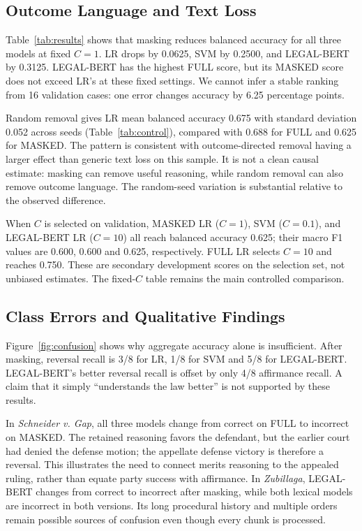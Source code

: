 \documentclass[conference]{IEEEtran}
\begin{document}
\subsection{Outcome Language and Text Loss}
Table~\ref{tab:results} shows that masking reduces balanced accuracy for all three models at fixed $C=1$. LR drops by 0.0625, SVM by 0.2500, and LEGAL-BERT by 0.3125. LEGAL-BERT has the highest FULL score, but its MASKED score does not exceed LR's at these fixed settings. We cannot infer a stable ranking from 16 validation cases: one error changes accuracy by 6.25 percentage points.

Random removal gives LR mean balanced accuracy 0.675 with standard deviation 0.052 across seeds (Table~\ref{tab:control}), compared with 0.688 for FULL and 0.625 for MASKED. The pattern is consistent with outcome-directed removal having a larger effect than generic text loss on this sample. It is not a clean causal estimate: masking can remove useful reasoning, while random removal can also remove outcome language. The random-seed variation is substantial relative to the observed difference.

When $C$ is selected on validation, MASKED LR ($C=1$), SVM ($C=0.1$), and LEGAL-BERT LR ($C=10$) all reach balanced accuracy 0.625; their macro F1 values are 0.600, 0.600 and 0.625, respectively. FULL LR selects $C=10$ and reaches 0.750. These are secondary development scores on the selection set, not unbiased estimates. The fixed-$C$ table remains the main controlled comparison.

\subsection{Class Errors and Qualitative Findings}
Figure~\ref{fig:confusion} shows why aggregate accuracy alone is insufficient. After masking, reversal recall is 3/8 for LR, 1/8 for SVM and 5/8 for LEGAL-BERT. LEGAL-BERT's better reversal recall is offset by only 4/8 affirmance recall. A claim that it simply ``understands the law better'' is not supported by these results.

In \emph{Schneider v. Gap}, all three models change from correct on FULL to incorrect on MASKED. The retained reasoning favors the defendant, but the earlier court had denied the defense motion; the appellate defense victory is therefore a reversal. This illustrates the need to connect merits reasoning to the appealed ruling, rather than equate party success with affirmance. In \emph{Zubillaga}, LEGAL-BERT changes from correct to incorrect after masking, while both lexical models are incorrect in both versions. Its long procedural history and multiple orders remain possible sources of confusion even though every chunk is processed.
\end{document}
